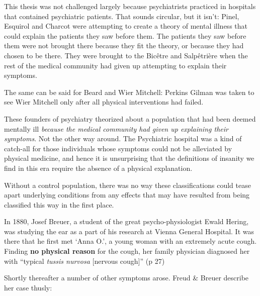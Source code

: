 This thesis was not challenged largely because psychiatrists practiced in hospitals that contained psychiatric patients. That sounds circular, but it isn't: Pinel, Esquirol and Charcot were attempting to create a theory of mental illness that could explain the patients they saw before them. The patients they saw before them were not brought there because they fit the theory, or because they had chosen to be there. They were brought to the Bicêtre and Salpêtrière when the rest of the medical community had given up attempting to explain their symptoms.

The same can be said for Beard and Wier Mitchell: Perkins Gilman was taken to see Wier Mitchell only after all physical interventions had failed.

These founders of psychiatry theorized about a population that had been deemed mentally ill \emph{because the medical community had given up explaining their symptoms}. Not the other way around. The Psychiatric hospital was a kind of catch-all for those individuals whose symptoms could not be alleviated by physical medicine, and hence it is unsurprising that the definitions of insanity we find in this era require the absence of a physical explanation.

Without a control population, there was no way these classifications could tease apart underlying conditions from any effects that may have resulted from being classified this way in the first place. 

In 1880, Josef Breuer, a student of the great psycho-physiologist Ewald Hering, was studying the ear as a part of his research at Vienna General Hospital. It was there that he first met `Anna O.', a young woman with an extremely acute cough. Finding \textbf{no physical reason} for the cough, her family physician diagnosed her with ``typical \emph{tussis nurvosa} [nervous cough]'' (p 27) 

Shortly thereafter a number of other symptoms arose. Freud \& Breuer describe her case thusly:


